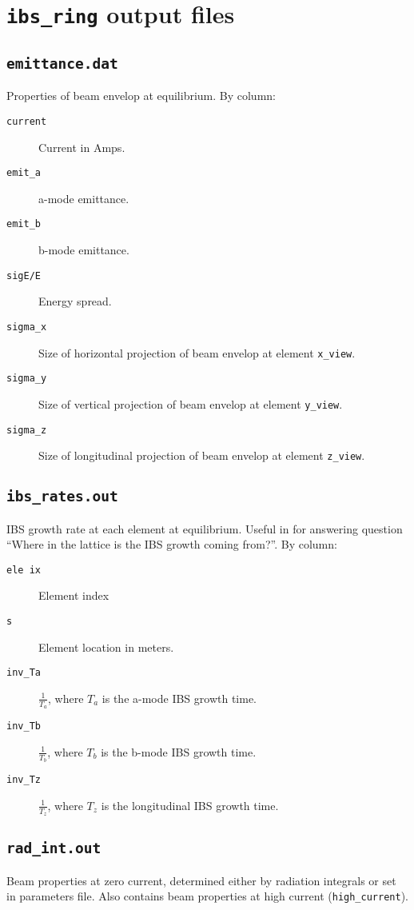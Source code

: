 \documentclass[11pt]{article}
\begin{document}
\section{{\tt ibs_ring} output files}

\subsection{{\tt emittance.dat}}
Properties of beam envelop at equilibrium.  By column:
\begin{description}
\item[{\tt current}] Current in Amps.
\item[{\tt emit_a}] a-mode emittance.
\item[{\tt emit_b}] b-mode emittance.
\item[{\tt sigE/E}] Energy spread.
\item[{\tt sigma_x}] Size of horizontal projection of beam envelop at element {\tt x_view}.
\item[{\tt sigma_y}] Size of vertical projection of beam envelop at element {\tt y_view}.
\item[{\tt sigma_z}] Size of longitudinal projection of beam envelop at element {\tt z_view}.
\end{description}

\subsection{{\tt ibs_rates.out}}
IBS growth rate at each element at equilibrium.  Useful in for answering question
``Where in the lattice is the IBS growth coming from?''.  By column:
\begin{description}
\item[{\tt ele ix}] Element index
\item[{\tt s}] Element location in meters.
\item[{\tt inv_Ta}] $\frac{1}{T_a}$, where $T_a$ is the a-mode IBS growth time.
\item[{\tt inv_Tb}] $\frac{1}{T_b}$, where $T_b$ is the b-mode IBS growth time.
\item[{\tt inv_Tz}] $\frac{1}{T_z}$, where $T_z$ is the longitudinal IBS growth time.
\end{description}

\subsection{{\tt rad_int.out}}
Beam properties at zero current, determined either by radiation integrals or set
in parameters file.  Also contains beam properties at high current ({\tt high_current}).
\end{document}
